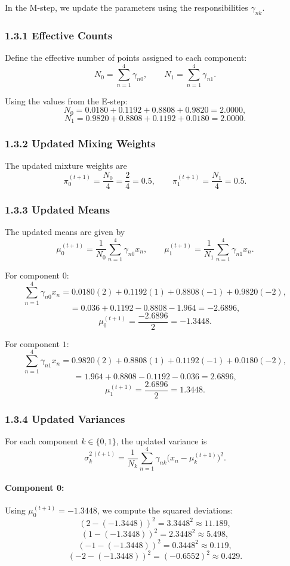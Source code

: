 \documentclass{article}
\begin{document}
In the M-step, we update the parameters using the responsibilities $\gamma_{nk}$.

\subsubsection*{1.3.1 Effective Counts}

Define the effective number of points assigned to each component:
\[
N_0 = \sum_{n=1}^4 \gamma_{n0}, \qquad
N_1 = \sum_{n=1}^4 \gamma_{n1}.
\]

Using the values from the E-step:
\[
N_0 = 0.0180 + 0.1192 + 0.8808 + 0.9820 = 2.0000,
\]
\[
N_1 = 0.9820 + 0.8808 + 0.1192 + 0.0180 = 2.0000.
\]

\subsubsection*{1.3.2 Updated Mixing Weights}

The updated mixture weights are
\[
\pi_0^{(t+1)} = \frac{N_0}{4} = \frac{2}{4} = 0.5,
\qquad
\pi_1^{(t+1)} = \frac{N_1}{4} = 0.5.
\]

\subsubsection*{1.3.3 Updated Means}

The updated means are given by
\[
\mu_0^{(t+1)} = \frac{1}{N_0} \sum_{n=1}^4 \gamma_{n0} x_n,
\qquad
\mu_1^{(t+1)} = \frac{1}{N_1} \sum_{n=1}^4 \gamma_{n1} x_n.
\]

For component $0$:
\[
\sum_{n=1}^4 \gamma_{n0} x_n
= 0.0180(2) + 0.1192(1) + 0.8808(-1) + 0.9820(-2),
\]
\[
= 0.036 + 0.1192 - 0.8808 - 1.964 = -2.6896,
\]
\[
\mu_0^{(t+1)} = \frac{-2.6896}{2} = -1.3448.
\]

For component $1$:
\[
\sum_{n=1}^4 \gamma_{n1} x_n
= 0.9820(2) + 0.8808(1) + 0.1192(-1) + 0.0180(-2),
\]
\[
= 1.964 + 0.8808 - 0.1192 - 0.036 = 2.6896,
\]
\[
\mu_1^{(t+1)} = \frac{2.6896}{2} = 1.3448.
\]

\subsubsection*{1.3.4 Updated Variances}

For each component $k \in \{0,1\}$, the updated variance is
\[
\sigma_k^{2\,(t+1)} = 
\frac{1}{N_k} 
\sum_{n=1}^4 \gamma_{nk}\bigl(x_n - \mu_k^{(t+1)}\bigr)^2.
\]

\paragraph{Component 0:}
Using $\mu_0^{(t+1)} = -1.3448$, we compute the squared deviations:
\[
(2 - (-1.3448))^2 = 3.3448^2 \approx 11.189,
\]
\[
(1 - (-1.3448))^2 = 2.3448^2 \approx 5.498,
\]
\[
(-1 - (-1.3448))^2 = 0.3448^2 \approx 0.119,
\]
\[
(-2 - (-1.3448))^2 = (-0.6552)^2 \approx 0.429.
\]
\end{document}

